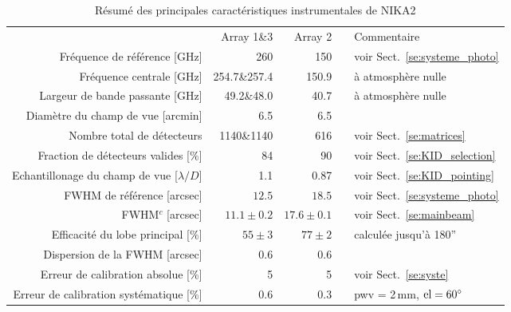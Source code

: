 \begin{table}[!thbp]
  \caption{Résumé des principales caractéristiques instrumentales de NIKA2}
  \label{tab:nika2summary}
  \centering    
  \begin{tabular}{rrrcl}
  \hline\hline
  \noalign{\smallskip}
  & Array 1\&3 & Array 2 & & Commentaire \\
  \noalign{\smallskip}
  \hline
  \noalign{\smallskip}
  Fréquence de référence [GHz]  & 260  & 150   &  & \footnotesize{voir Sect.~\ref{se:systeme_photo}}  \\
  Fréquence centrale [GHz]      &  254.7\&257.4  & 150.9 &  & \footnotesize{à atmosphère nulle}   \\
  Largeur de bande passante  [GHz]     &   49.2\&48.0   & 40.7  &  & \footnotesize{à atmosphère nulle} \\
  \hline
  \noalign{\smallskip}
  Diamètre du champ de vue     [arcmin] &   6.5       &   6.5   &  &  \\  
  Nombre total de détecteurs            &  1140\&1140 &    616  & & \footnotesize{voir Sect.~\ref{se:matrices}}\\
  Fraction de détecteurs valides [$\%$] &  84         &     90  & & \footnotesize{voir Sect.~\ref{se:KID_selection}} \\
  Echantillonage du champ de vue \hspace{3mm} [$\lambda/D$] & 1.1 &  0.87 & & \footnotesize{voir Sect.~\ref{se:KID_pointing}} \\
  \hline
  \noalign{\smallskip}
  FWHM de référence\hspace{3mm} [arcsec]          & $12.5$     &   $18.5$  &  & \footnotesize{voir Sect.~\ref{se:systeme_photo}}\\
  FWHM$^c$\hspace{3mm} [arcsec]    &  $11.1 \pm 0.2$  &  $17.6 \pm 0.1$  & & \footnotesize{voir Sect.~\ref{se:mainbeam}}\\
  Efficacité du lobe principal \hspace{3mm} [$\%$] &  $55 \pm 3$   &  $77 \pm 2$  &  & \footnotesize{calculée jusqu'à 180''}\\
  Dispersion de la FWHM [arcsec]  &    0.6        &      0.6        & & \footnotesize{\citet{Adam2018}} \\
  \hline
  \noalign{\smallskip}
  Erreur de calibration absolue [\%]      &   5         & 5 & &  \footnotesize{voir Sect.~\ref{se:syste}}\\
  Erreur de calibration systématique\hspace{3mm}  [\%]      &    0.6        & 0.3 & & \footnotesize{pwv = 2\,mm, $\rm{el} = 60^{\circ}$} \\

\end{tabular}
\end{table}
